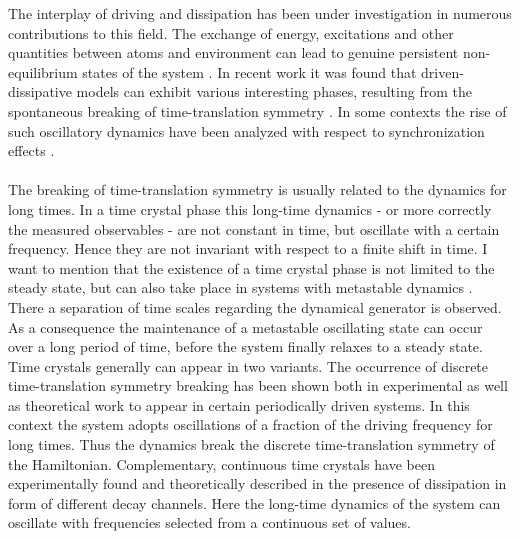 The interplay of driving and dissipation has been under investigation in numerous contributions to this field. The exchange of energy, excitations and other quantities between atoms and environment can lead to genuine persistent non-equilibrium states of the system \cite{diehl_quantum_2008,diehl_dynamical_2010,cabot_metastable_2022,mattes_entangled_2023,krishna_measurement-induced_2023,jin_photon_2013,marcuzzi_absorbing_2016}. In recent work it was found that driven-dissipative models can exhibit various interesting phases, %
resulting from the spontaneous breaking of time-translation symmetry \cite{mattes_entangled_2023,krishna_measurement-induced_2023}. In some contexts the rise of such oscillatory dynamics have been analyzed with respect to synchronization effects \cite{cabot_quantum_2019,cabot_metastable_2021,giorgi_transient_2019,weiner_phase_2017}.\\\\%
The breaking of time-translation symmetry is usually related to the dynamics for long times. In a time crystal phase this long-time dynamics - or more correctly the measured observables - are not constant in time, but oscillate with a certain frequency. Hence they are not invariant with respect to a finite shift in time. I want to mention that the existence of a time crystal phase is not limited to the steady state, but can also take place in systems with metastable dynamics \cite{else_prethermal_2017,gambetta_discrete_2019}. There a separation of time scales regarding the dynamical generator is observed. As a consequence the maintenance of a metastable oscillating state can occur over a long period of time, before the system finally relaxes to a steady state. \\Time crystals generally can appear in two variants. The occurrence of discrete time-translation symmetry breaking has been shown both in experimental  \cite{choi_observation_2017,zhang_observation_2017} as well as theoretical work \cite{yao_discrete_2017,sacha_time_2018} to appear in certain periodically driven systems. In this context the system adopts oscillations of a fraction of the driving frequency for long times. Thus the dynamics break the discrete time-translation symmetry of the Hamiltonian. Complementary, continuous time crystals have been experimentally found \cite{kesler_emergent_2019} and theoretically described \cite{tucker_shattered_2018,iemini_boundary_2018,owen_quantum_2018} in the presence of dissipation in form of different decay channels. Here the long-time dynamics of the system can oscillate with frequencies selected from a continuous set of values. 

